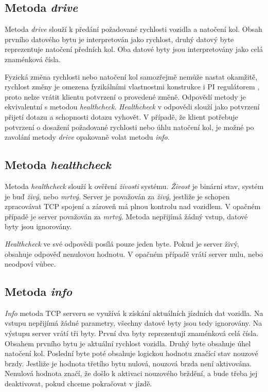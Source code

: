 \documentclass[czech, bachelor]{diploma}
\begin{document}
\subsection{Metoda \emph{drive}}
Metoda \emph{drive} slouží k předání požadované rychlosti vozidla a natočení kol. Obsah prvního datového bytu je interpretován
jako rychlost, druhý datový byte reprezentuje natočení předních kol. Oba datové byty jsou interpretovány jako celá znaménková
čísla.

Fyzická změna rychlosti nebo natočení kol samozřejmě nemůže nastat okamžitě, rychlost změny je omezena fyzikálními vlastnostmi
konstrukce i PI regulátorem \cite{pid-controller-source}, proto nelze vrátit klientu potvrzení o provedené změně. Odpovědí metody
je ekvivalentní s metodou \emph{healthcheck}. \emph{Healthcheck} v odpovědi slouží jako potvrzení přijetí dotazu a schopnosti
dotazu vyhovět. V případě, že klient potřebuje potvrzení o dosažení požadované rychlosti nebo úhlu natočení kol, je možné
po zavolání metody \emph{drive} opakovaně volat metodu \emph{info}.

\subsection{Metoda \emph{healthcheck}}
Metoda \emph{healthcheck} slouží k ověření \emph{živosti} systému. \emph{Živost} je binární stav, systém je buď \emph{živý}, nebo
\emph{mrtvý}. Server je považován za \emph{živý}, jestliže je schopen zpracovávat TCP spojení a zároveň má plnou kontrolu
nad vozidlem. V opačném případě je server považován za \emph{mrtvý}. Metoda nepřijímá žádný vstup, datové byty jsou ignorovány.

\emph{Healthcheck} ve své odpovědi posílá pouze jeden byte. Pokud je server živý, obsahuje odpověď nenulovou hodnotu. V opačném
případě vrátí server nulu, nebo neodpoví vůbec.

\subsection{Metoda \emph{info}}
\emph{Info} metoda TCP serveru se využívá k získání aktuálních jízdních dat vozidla. Na vstupu nepřijímá žádné parametry, všechny
datové byty jsou tedy ignorovány. Na výstupu server vrátí tři byty. První dva byty reprezentují znaménková celá čísla. Obsahem
prvního bytu je aktuální rychlost vozidla. Druhý byte obsahuje úhel natočení kol. Poslední byte poté obsahuje logickou hodnotu
značící stav nouzové brzdy. Jestliže je hodnota třetího bytu nulová, nouzová brzda není aktivována. Nenulová hodnota značí,
že došlo k aktivaci nouzového brždění, a bude třeba jej deaktivovat, pokud chceme pokračovat v jízdě.
\end{document}

